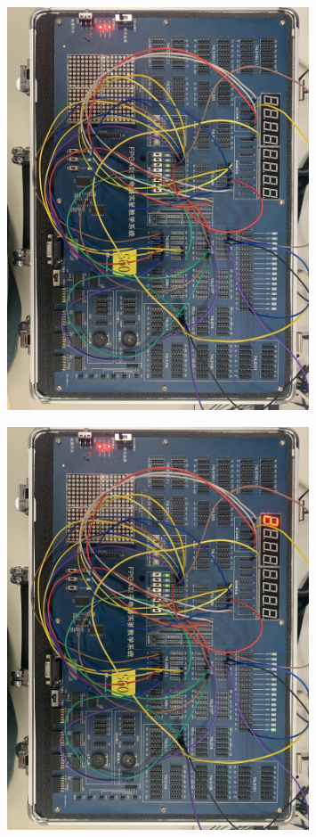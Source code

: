\documentclass[UTF8, a4paper, 11pt]{article}
\begin{document}
\begin{figure}[H]
    \centering
    \includegraphics[width=0.8\textwidth]{箱100.png}
\end{figure}
\begin{figure}[H]
    \centering
    \includegraphics[width=0.8\textwidth]{箱101.png}
\end{figure}
\end{document}
